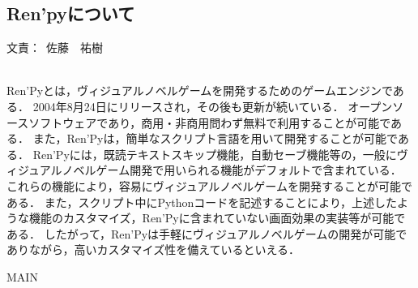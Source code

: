 \documentclass[a4paper]{jarticle}
\newcommand{\resp}[1]{\begin{flushright}文責：~#1\end{flushright}~\\}
\begin{document}
\fi

\subsection{Ren'pyについて}
  \resp{佐藤　祐樹}

  Ren'Pyとは，ヴィジュアルノベルゲームを開発するためのゲームエンジンである．
2004年8月24日にリリースされ，その後も更新が続いている．
オープンソースソフトウェアであり，商用・非商用問わず無料で利用することが可能である．
また，Ren'Pyは，簡単なスクリプト言語を用いて開発することが可能である．
Ren'Pyには，既読テキストスキップ機能，自動セーブ機能等の，一般にヴィジュアルノベルゲーム開発で用いられる機能がデフォルトで含まれている．
これらの機能により，容易にヴィジュアルノベルゲームを開発することが可能である．
また，スクリプト中にPythonコードを記述することにより，上述したような機能のカスタマイズ，Ren'Pyに含まれていない画面効果の実装等が可能である．
したがって，Ren'Pyは手軽にヴィジュアルノベルゲームの開発が可能でありながら，高いカスタマイズ性を備えているといえる．

\expandafter\ifx\csname MAIN \endcsname\relax
  
\end{document}
